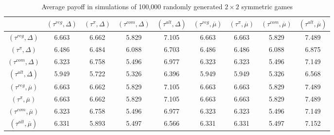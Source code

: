 \documentclass[fleqn,reqno,11pt]{article}
\begin{document}
\begin{table}[]
\centering
\footnotesize
\begin{tabular}{ccccccccc}
  \hline
 & $(\tau^{reg}, \Delta)$ 
 & $(\tau^{\pi}, \Delta)$ 
 & $(\tau^{com}, \Delta)$
 & $(\tau^{alt}, \Delta)$
 & $(\tau^{reg}, \overline{\mu})$ 
 & $(\tau^{\pi}, \overline{\mu})$ 
 & $(\tau^{com}, \overline{\mu})$
 & $(\tau^{alt}, \overline{\mu})$ \\ 
  \hline
  $(\tau^{reg}, \Delta)$ & 6.663 & 6.662 & 5.829 & 7.105 & 6.663 & 6.663 & 5.829 & 7.489 \\
  $(\tau^{\pi}, \Delta)$ & 6.486 & 6.484 & 6.088 & 6.703 & 6.486 & 6.486 & 6.088 & 6.875 \\
  $(\tau^{com}, \Delta)$ & 6.323 & 6.758 & 5.496 & 6.977 & 6.323 & 6.323 & 5.496 & 7.149 \\
  $(\tau^{alt}, \Delta)$ & 5.949 & 5.722 & 5.326 & 6.396 & 5.949 & 5.949 & 5.326 & 6.568 \\
  $(\tau^{reg}, \overline{\mu})$ & 6.663 & 6.662 & 5.829 & 7.105 & 6.663 & 6.663 & 5.829 & 7.489 \\
  $(\tau^{\pi}, \overline{\mu})$ & 6.663 & 6.662 & 5.829 & 7.105 & 6.663 & 6.663 & 5.829 & 7.489 \\
  $(\tau^{com}, \overline{\mu})$ & 6.323 & 6.758 & 5.496 & 6.977 & 6.323 & 6.323 & 5.496 & 7.149 \\
  $(\tau^{alt}, \overline{\mu})$ & 6.331 & 5.893 & 5.497 & 6.566 & 6.331 & 6.331 & 5.497 & 7.152 \\
   \hline                          
\end{tabular}                      
\caption{Average payoff in simulations of 100,000
  randomly generated $2 \times 2$ symmetric games}
\label{tab:ExpectedFitness_2x2_Full}        
\end{table}   
 
 
\end{document}
